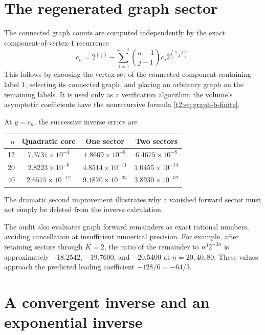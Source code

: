 \documentclass[11pt,openany]{book}
\numberwithin{equation}{chapter}
\theoremstyle{plain}
\theoremstyle{definition}
\theoremstyle{remark}
\begin{document}
\section{The regenerated graph sector}

The connected graph counts are computed independently by the exact component-of-vertex-$1$ recurrence
\begin{equation}
 c_n=2^{\binom n2}-\sum_{j=1}^{n-1}
         \binom{n-1}{j-1}c_j2^{\binom{n-j}{2}}.
 \label{t2:eq:graph-check-recurrence}
\end{equation}
This follows by choosing the vertex set of the connected component containing label $1$, selecting its connected graph, and placing an arbitrary graph on the remaining labels. It is used only as a verification algorithm; the volume's asymptotic coefficients have the nonrecursive formula \eqref{t2:eq:graph-b-finite}.

At $y=c_n$, the successive inverse errors are
\begin{center}
\begin{tabular}{rccc}
\toprule
$n$ & Quadratic core & One sector & Two sectors\\\midrule
12 & $7.3731\times10^{-4}$ & $1.8669\times10^{-6}$ & $6.4675\times10^{-8}$\\
20 & $2.8223\times10^{-6}$ & $4.8514\times10^{-11}$ & $1.0455\times10^{-14}$\\
40 & $2.6575\times10^{-12}$ & $9.1870\times10^{-23}$ & $3.8930\times10^{-32}$\\\bottomrule
\end{tabular}
\end{center}
The dramatic second improvement illustrates why a vanished forward sector must not simply be deleted from the inverse calculation.

The audit also evaluates graph forward remainders as exact rational numbers, avoiding cancellation at insufficient numerical precision. For example, after retaining sectors through $K=2$, the ratio of the remainder to $n^3 2^{-3n}$ is approximately $-18.2542$, $-19.7600$, and $-20.5400$ at $n=20,40,80$. These values approach the predicted leading coefficient $-128/6=-64/3$.

\section{A convergent inverse and an exponential inverse}
\end{document}
